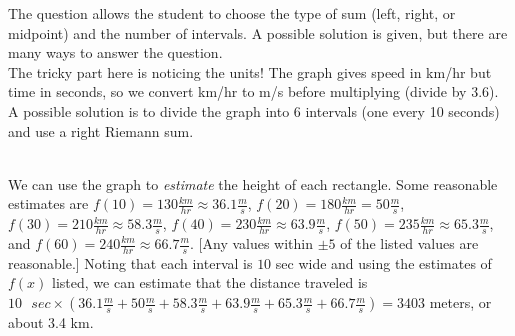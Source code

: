 \begin{Answer}[ref=rsum4]
	The question allows the student to choose the type of sum (left, right, or midpoint) and the number of intervals. A possible solution is given, but there are many ways to answer the question.\\
	The tricky part here is noticing the units! The graph gives speed in km/hr but time in seconds, so we convert km/hr to m/s before multiplying (divide by 3.6). A possible solution is to divide the graph into 6 intervals (one every 10 seconds) and use a right Riemann sum.

	\\
	We can use the graph to \textit{estimate} the height of each rectangle. Some reasonable estimates are $f(10) = 130\frac{km}{hr}\approx36.1\frac{m}{s}$, $f(20) = 180\frac{km}{hr}=50\frac{m}{s}$, $f(30) = 210\frac{km}{hr}\approx58.3\frac{m}{s}$, $f(40) = 230\frac{km}{hr}\approx63.9\frac{m}{s}$, $f(50) = 235\frac{km}{hr}\approx65.3\frac{m}{s}$, and $f(60) = 240\frac{km}{hr}\approx66.7\frac{m}{s}$. [Any values within $\pm5$ of the listed values are reasonable.] Noting that each interval is $10$ sec wide and using the estimates of $f(x)$ listed, we can estimate that the distance traveled is $10\text{ }sec\times(36.1\frac{m}{s}+50\frac{m}{s}+58.3\frac{m}{s}+63.9\frac{m}{s}+65.3\frac{m}{s}+66.7\frac{m}{s})=3403$ meters, or about 3.4 km.
\end{Answer}
